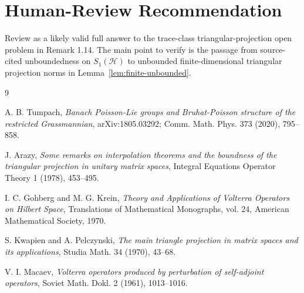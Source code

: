 \documentclass[11pt]{amsart}
\newcommand{\Hh}{\mathcal H}
\begin{document}
\section*{Human-Review Recommendation}

Review as a likely valid full answer to the trace-class triangular-projection
open problem in Remark 1.14. The main point to verify is the passage from
source-cited unboundedness on \(S_1(\Hh)\) to unbounded finite-dimensional
triangular projection norms in Lemma~\ref{lem:finite-unbounded}.

\begin{thebibliography}{9}

A. B. Tumpach,
\emph{Banach Poisson-Lie groups and Bruhat-Poisson structure of the
restricted Grassmannian},
arXiv:1805.03292; Comm. Math. Phys. 373 (2020), 795--858.

J. Arazy,
\emph{Some remarks on interpolation theorems and the boundness of the
triangular projection in unitary matrix spaces},
Integral Equations Operator Theory 1 (1978), 453--495.

I. C. Gohberg and M. G. Krein,
\emph{Theory and Applications of Volterra Operators on Hilbert Space},
Translations of Mathematical Monographs, vol. 24, American Mathematical
Society, 1970.

S. Kwapien and A. Pelczynski,
\emph{The main triangle projection in matrix spaces and its applications},
Studia Math. 34 (1970), 43--68.

V. I. Macaev,
\emph{Volterra operators produced by perturbation of self-adjoint operators},
Soviet Math. Dokl. 2 (1961), 1013--1016.

\end{thebibliography}
\end{document}
